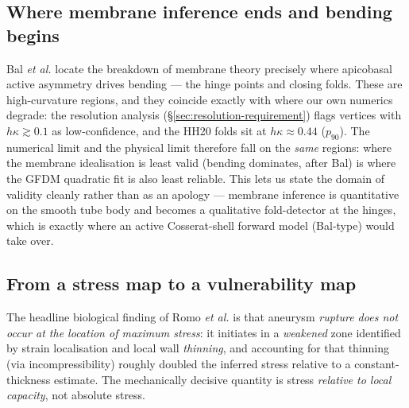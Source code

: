 \documentclass[11pt]{article}
\begin{document}
\subsection{Where membrane inference ends and bending begins}
\label{sec:nt-bending}

Bal \textit{et al.} locate the breakdown of membrane theory precisely where
apicobasal active asymmetry drives bending --- the hinge points and closing
folds.  These are high-curvature regions, and they coincide exactly with where
our own numerics degrade: the resolution analysis (\S\ref{sec:resolution-requirement})
flags vertices with $h\kappa\gtrsim0.1$ as low-confidence, and the HH20 folds sit
at $h\kappa\approx0.44$ ($p_{90}$).  The numerical limit and the physical limit
therefore fall on the \emph{same} regions: where the membrane idealisation is
least valid (bending dominates, after Bal) is where the GFDM quadratic fit is
also least reliable.  This lets us state the domain of validity cleanly rather
than as an apology --- membrane inference is quantitative on the smooth tube body
and becomes a qualitative fold-detector at the hinges, which is exactly where an
active Cosserat-shell forward model (Bal-type) would take over.

\subsection{From a stress map to a vulnerability map}
\label{sec:nt-vulnerability}

The headline biological finding of Romo \textit{et al.} is that aneurysm
\emph{rupture does not occur at the location of maximum stress}: it initiates in a
\emph{weakened} zone identified by strain localisation and local wall
\emph{thinning}, and accounting for that thinning (via incompressibility) roughly
doubled the inferred stress relative to a constant-thickness estimate.  The
mechanically decisive quantity is stress \emph{relative to local capacity}, not
absolute stress.
\end{document}
